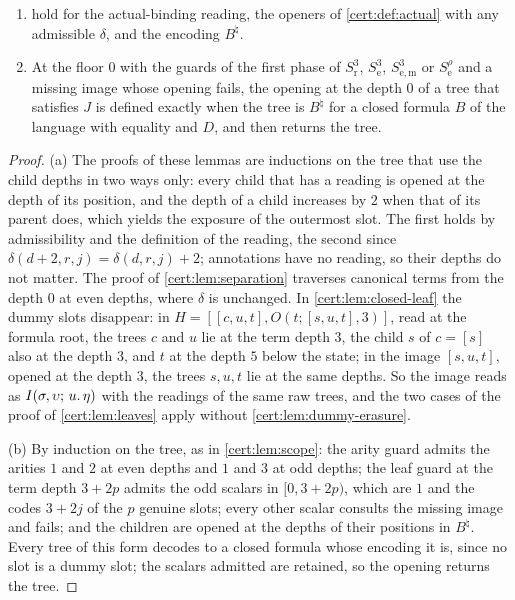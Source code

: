 \begin{lemma}\label{cert:lem:actual}
\begin{enumerate}[label=(\alph*)]
\item {}
hold for the actual-binding reading, the openers of \cref{cert:def:actual} with any
admissible $\delta$, and the encoding $B^{\natural}$.
\item At the floor $0$ with the guards of the first phase of $S^{3}_{\mathrm r}$,
$S^{3}_{\mathrm e}$, $S^{3}_{\mathrm{e,m}}$ or $S^{\rho}_{\mathrm e}$ and a missing image
whose opening fails, the opening at the depth $0$ of a tree that satisfies $J$ is defined
exactly when the tree is $B^{\natural}$ for a closed formula $B$ of the language with
equality and $D$, and then returns the tree.
\end{enumerate}
\end{lemma}
\begin{proof}
(a) The proofs of these lemmas are inductions on the tree that use the child depths in
two ways only: every child that has a reading is opened at the depth of its position,
and the depth of a child increases by $2$ when that of its parent does, which yields the
exposure of the outermost slot. The first holds by admissibility and the definition of
the reading, the second since $\delta(d+2,r,j)=\delta(d,r,j)+2$; annotations have no
reading, so their depths do not matter. The proof of \cref{cert:lem:separation}
traverses canonical terms from the depth $0$ at even depths, where $\delta$ is unchanged.
In \cref{cert:lem:closed-leaf} the dummy slots disappear: in
$H=[[c,u,t],O(t;[s,u,t],3)]$, read at the formula root, the trees $c$ and $u$ lie at the
term depth $3$, the child $s$ of $c=[s]$ also at the depth $3$, and $t$ at the depth $5$
below the state; in the image $[s,u,t]$, opened at the depth $3$, the trees $s,u,t$ lie
at the same depths. So the image reads as $I(\sigma,\upsilon;\,u.\,\eta)$ with the
readings of the same raw trees, and the two cases of the proof of \cref{cert:lem:leaves}
apply without \cref{cert:lem:dummy-erasure}.

(b) By induction on the tree, as in \cref{cert:lem:scope}: the arity guard admits the
arities $1$ and $2$ at even depths and $1$ and $3$ at odd depths; the leaf guard at the
term depth $3+2p$ admits the odd scalars in $[0,3+2p)$, which are $1$ and the codes
$3+2j$ of the $p$ genuine slots; every other scalar consults the missing image and fails;
and the children are opened at the depths of their positions in $B^{\natural}$. Every tree
of this form decodes to a closed formula whose encoding it is, since no slot is a dummy
slot; the scalars admitted are retained, so the opening returns the tree.
\end{proof}

